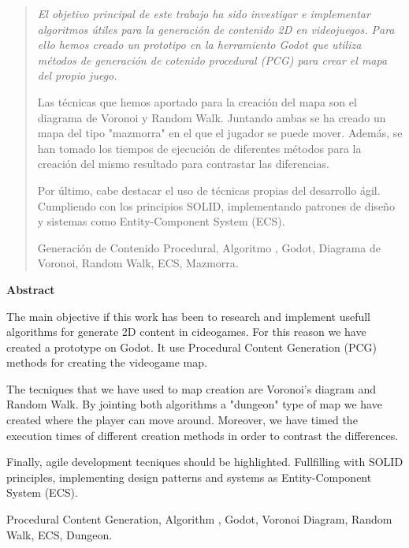 \documentclass[spanish,a4paper,12pt,oneside]{extreport}
\newenvironment{summary}
{\par\noindent\begin{center}\textbf{Abstract}\end{center}\begin{itshape}\par\noindent}
{\end{itshape}}
\newenvironment{keywords}
{\begin{list}{}{\setlength{\leftmargin}{1em}}\item[\hskip\labelsep \bfseries Keywords:]}
{\end{list}}
\newenvironment{palabrasClave}
{\begin{list}{}{\setlength{\leftmargin}{1em}}\item[\hskip\labelsep \bfseries Palabras clave:]}
{\end{list}}
\begin{document}
\newpage 
\thispagestyle{empty}

\begin{abstract}
{\em
El objetivo principal de este trabajo ha sido investigar e implementar algoritmos útiles para la generación de contenido 2D en videojuegos. Para ello hemos creado un prototipo en la herramiento Godot que utiliza métodos de generación de cotenido procedural (PCG) para crear el mapa del propio juego. 

Las técnicas que hemos aportado para la creación del mapa son el diagrama de Voronoi y Random Walk. Juntando ambas se ha creado un mapa del tipo "mazmorra" en el que el jugador se puede mover. Además, se han tomado los tiempos de ejecución de diferentes métodos para la creación del mismo resultado para contrastar las diferencias.

Por último, cabe destacar el uso de técnicas propias del desarrollo ágil. Cumpliendo con los principios SOLID, implementando patrones de diseño y sistemas como Entity-Component System (ECS).
}

\begin{palabrasClave}
Generación de Contenido Procedural, Algoritmo , Godot, Diagrama de Voronoi, Random Walk, ECS, Mazmorra.
\end{palabrasClave}

\end{abstract}
\newpage 
\vspace*{200px}
\thispagestyle{empty}

\begin{summary}
{
  The main objective if this work has been to research and implement usefull algorithms for generate 2D content in cideogames. For this reason we have created a prototype on Godot. It use Procedural Content Generation (PCG) methods for creating the videogame map. 

  The tecniques that we have used to map creation are Voronoi's diagram and Random Walk. By jointing both algorithms a "dungeon" type of map we have created where the player can move around. Moreover, we have timed the execution times of different creation methods in order to contrast the differences. 

  Finally, agile development tecniques should be highlighted. Fullfilling with SOLID principles, implementing design patterns and systems as Entity-Component System (ECS).
}

\em
\begin {keywords}
Procedural Content Generation, Algorithm , Godot, Voronoi Diagram, Random Walk, ECS, Dungeon.
\end {keywords}

\end{summary}
\newpage{\pagestyle{empty}}
\thispagestyle{empty}
\end{document}
